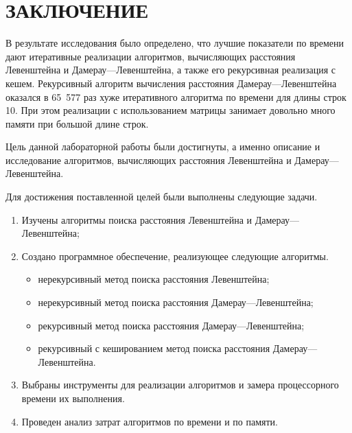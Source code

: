 \chapter*{ЗАКЛЮЧЕНИЕ}

В результате исследования было определено, что лучшие показатели по времени дают итеративные реализации алгоритмов, вычисляющих расстояния Левенштейна и Дамерау---Левенштейна, а также его рекурсивная реализация с кешем. Рекурсивный алгоритм вычисления расстояния Дамерау---Левенштейна оказался в 65 577 раз хуже итеративного алгоритма по времени для длины строк 10. При этом реализации с использованием матрицы занимает довольно много памяти при большой длине строк.

Цель данной лабораторной работы были достигнуты, а именно описание и исследование алгоритмов, вычисляющих расстояния Левенштейна и Дамерау---Левенштейна.

Для достижения поставленной целей были выполнены следующие задачи.
\begin{enumerate}
	\item Изучены алгоритмы поиска расстояния Левенштейна и \newline Дамерау---Левенштейна;
	\item Создано программное обеспечение, реализующее следующие алгоритмы.
	\begin{itemize}
		\item нерекурсивный метод поиска расстояния Левенштейна;
		\item нерекурсивный метод поиска расстояния Дамерау---Левенштейна;
		\item рекурсивный метод поиска расстояния Дамерау---Левенштейна;
		\item рекурсивный с кешированием метод поиска расстояния Дамерау---Левенштейна.
	\end{itemize}
	\item Выбраны инструменты для реализации алгоритмов и замера процессорного времени их выполнения.
	\item Проведен анализ затрат алгоритмов по времени и по памяти. 
\end{enumerate}